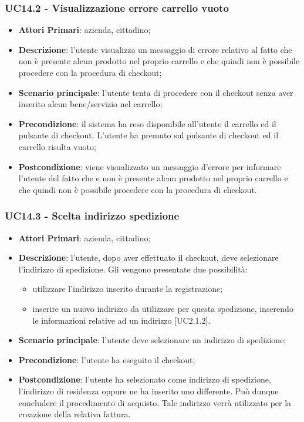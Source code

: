 \subsubsection{UC14.2 - Visualizzazione errore carrello vuoto}
\begin{itemize}
	\item \textbf{Attori Primari}: azienda, cittadino;
	\item \textbf{Descrizione}:
	l'utente visualizza un messaggio di errore relativo al fatto che non è presente alcun prodotto nel proprio carrello e che quindi non è possibile procedere con la procedura di checkout;
	\item \textbf{Scenario principale}: l'utente tenta di procedere con il checkout senza aver inserito alcun bene/servizio nel carrello;
	\item \textbf{Precondizione}: il sistema ha reso disponibile all'utente il carrello ed il pulsante di checkout. L'utente ha premuto sul pulsante di checkout ed il carrello risulta vuoto; 
	\item \textbf{Postcondizione}: viene visualizzato un messaggio d'errore per informare l'utente del fatto che e non è presente alcun prodotto nel proprio carrello e che quindi non è possibile procedere con la procedura di checkout.
\end{itemize}

\subsubsection{UC14.3 - Scelta indirizzo spedizione}
\begin{itemize}
	\item \textbf{Attori Primari}: azienda, cittadino;
	\item \textbf{Descrizione}:
	l'utente, dopo aver effettuato il checkout, deve selezionare l'indirizzo di spedizione. Gli vengono presentate due possibilità:
	\begin{itemize}
		\item utilizzare l'indirizzo inserito durante la registrazione;
		\item inserire un nuovo indirizzo da utilizzare per questa spedizione, inserendo le informazioni relative ad un indirizzo [UC2.1.2].
	\end{itemize}
	\item \textbf{Scenario principale}: l'utente deve selezionare un indirizzo di spedizione;
	\item \textbf{Precondizione}: l'utente ha eseguito il checkout;
	\item \textbf{Postcondizione}:
	l'utente ha selezionato come indirizzo di spedizione, l'indirizzo di 
	residenza oppure ne ha inserito uno differente. Può dunque concludere il 
	procedimento di acquisto. Tale indirizzo verrà utilizzato per la creazione 
	della relativa fattura.
\end{itemize}

